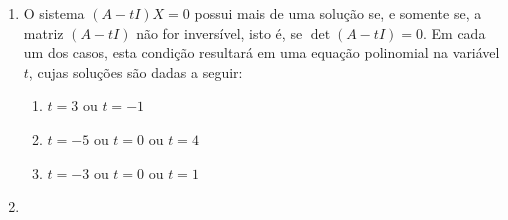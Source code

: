 \documentclass[12pt,a4paper]{article}
\begin{document}
\begin{enumerate}
\item O sistema $(A - tI)X = 0$ possui mais de uma solução se, e somente se, a matriz $(A - tI)$ não for inversível, isto é, se $\det(A - tI) = 0$. Em cada um dos casos, esta condição resultará em uma equação polinomial na variável $t$, cujas soluções são dadas a seguir:
\begin{enumerate}
\item $t=3$ ou $t=-1$
\item $t=-5$ ou $t=0$ ou $t=4$
\item $t=-3$ ou $t=0$ ou $t=1$
\end{enumerate}
\item
{}
\end{enumerate}
\end{document}
